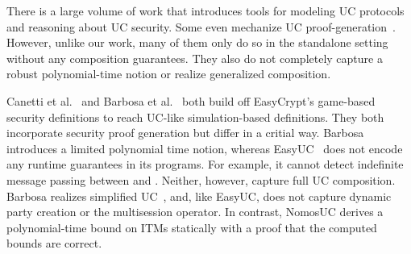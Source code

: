 There is a large volume of work that introduces tools for modeling UC protocols and reasoning about UC security.
Some even mechanize UC proof-generation~\cite{certicrypt, easycrypt, cryptoverif, cryptol, fstar}.
However, unlike our work, many of them only do so in the standalone setting without any composition guarantees.
They also do not completely capture a robust polynomial-time notion or realize generalized composition. 

Canetti et al.~\cite{easyuc} and Barbosa et al.~\cite{barbosa} both build off EasyCrypt's game-based security definitions to reach UC-like simulation-based definitions.
They both incorporate security proof generation but differ in a critial way.
Barbosa introduces a limited polynomial time notion, whereas EasyUC~\cite{easyuc} does not encode any runtime guarantees in its programs. 
For example, it cannot detect indefinite message passing between \A and \F. Neither, however, capture full UC composition.
Barbosa realizes simplified UC~\cite{suc}, and, like EasyUC, does not capture dynamic party creation or the multisession operator.
In contrast, NomosUC derives a polynomial-time bound on ITMs statically with a proof that the computed bounds are correct.

%

